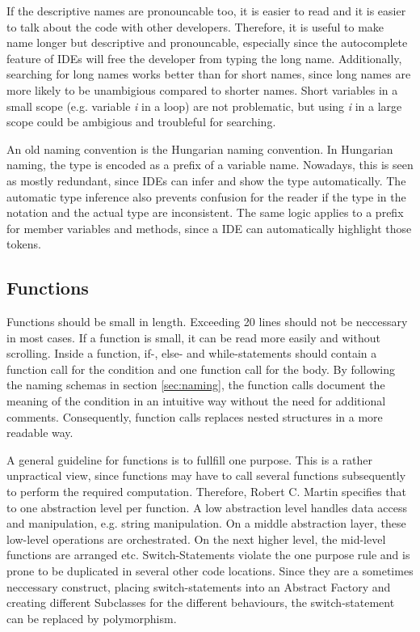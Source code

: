 If the descriptive names are pronouncable too, it is easier to read and it is easier to talk about the code with other developers. Therefore, it is useful to make name longer but descriptive and pronouncable, especially since the autocomplete feature of IDEs will free the developer from typing the long name. Additionally, searching for long names works better than for short names, since long names are more likely to be unambigious compared to shorter names. Short variables in a small scope (e.g. variable \textit{i} in a loop) are not problematic, but using \textit{i} in a large scope could be ambigious and troubleful for searching.

An old naming convention is the Hungarian naming convention. In Hungarian naming, the type is encoded as a prefix of a variable name. Nowadays, this is seen as mostly redundant, since IDEs can infer and show the type automatically. The automatic type inference also prevents confusion for the reader if the type in the notation and the actual type are inconsistent. The same logic applies to a prefix for member variables and methods, since a IDE can automatically highlight those tokens.

\subsection{Functions}\label{sec:functions}
Functions should be small in length. Exceeding 20 lines should not be neccessary in most cases. If a function is small, it can be read more easily and without scrolling. Inside a function, if-, else- and while-statements should contain a function call for the condition and one function call for the body.  By following the naming schemas in section \ref{sec:naming}, the function calls document the meaning of the condition in an intuitive way without the need for additional comments. Consequently, function calls replaces nested structures in a more readable way.

A general guideline for functions is to fullfill one purpose. This is a rather unpractical view, since functions may have to call several functions subsequently to perform the required computation. Therefore, Robert C. Martin specifies that to one abstraction level per function. A low abstraction level handles data access and manipulation, e.g. string manipulation. On a middle abstraction layer, these low-level operations are orchestrated. On the next higher level, the mid-level functions are arranged etc. Switch-Statements violate the one purpose rule and is prone to be duplicated in several other code locations. Since they are a sometimes neccessary construct, placing switch-statements into an Abstract Factory and creating different Subclasses for the different behaviours, the switch-statement can be replaced by polymorphism. 

